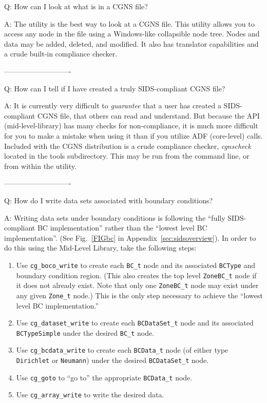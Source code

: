 \documentclass[12pt]{article}
\begin{document}
Q:  How can I look at what is in a CGNS file?

A:  The utility  is the best way to look at a CGNS
file.  This utility allows you to access any node in the file using
a Windows-like collapsible node tree. Nodes and data may be added,
deleted, and modified.
It also has translator capabilities and a crude built-in compliance checker.

----------------------------

Q:  How can I tell if I have created a truly SIDS-compliant CGNS file?

A:  It is currently very difficult to {\it guarantee} that a user has created
a SIDS-compliant CGNS file, that others can read and understand.  But because
the API (mid-level-library) has many checks for non-compliance, it is
much more difficult for you to make a mistake when using it
than if you utilize ADF (core-level) calls.
Included with
the CGNS distribution is a crude compliance checker, {\it cgnscheck}
located in the tools subdirectory. This may be run from the command line,
or from within the  utility.

----------------------------

Q:  How do I write data sets associated with boundary conditions?

A:  Writing data sets under boundary conditions is following the
    ``fully SIDS-compliant BC implementation'' rather than the ``lowest
    level BC implementation''.
    (See Fig.~\ref{FIGbc} in Appendix~\ref{sec:sidsoverview}).
    In order to do this using the Mid-Level Library, take the following
    steps:
    \begin{enumerate}
    \item Use \texttt{cg\_boco\_write} to create each \texttt{BC\_t}
          node and its associated \texttt{BCType} and boundary condition region.
          (This also creates the top level \texttt{ZoneBC\_t} node if it
          does not already exist.
          Note that only one \texttt{ZoneBC\_t} node may exist under any
          given \texttt{Zone\_t} node.)
          This is the only step necessary to achieve the ``lowest level
          BC implementation.''
    \item Use \texttt{cg\_dataset\_write} to create each
          \texttt{BCDataSet\_t} node and its associated
          \texttt{BCTypeSimple} under the desired \texttt{BC\_t} node.
    \item Use \texttt{cg\_bcdata\_write} to create each
          \texttt{BCData\_t} node (of either type \texttt{Dirichlet}
          or \texttt{Neumann}) under the desired \texttt{BCDataSet\_t}
          node.
    \item Use \texttt{cg\_goto} to ``go to'' the appropriate
          \texttt{BCData\_t} node.
    \item Use \texttt{cg\_array\_write} to write the desired data.
    \end{enumerate}
\end{document}

